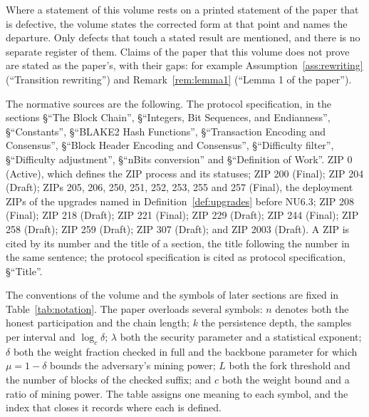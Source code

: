 \documentclass[11pt,a4paper]{article}
\theoremstyle{definition}
\begin{document}
Where a statement of this volume rests on a printed statement of the paper
that is defective, the volume states the corrected form at that point and
names the departure. Only defects that touch a stated result are mentioned,
and there is no separate register of them. Claims of the paper that this
volume does not prove are stated as the paper's, with their gaps: for
example Assumption~\ref{ass:rewriting} (``Transition rewriting'') and
Remark~\ref{rem:lemma1} (``Lemma 1 of the paper'').

The normative sources are the following. The protocol specification, in the
sections \S``The Block Chain'', \S``Integers, Bit Sequences, and
Endianness'', \S``Constants'', \S``BLAKE2 Hash Functions'',
\S``Transaction Encoding and Consensus'', \S``Block Header Encoding and
Consensus'', \S``Difficulty filter'', \S``Difficulty adjustment'',
\S``nBits conversion'' and \S``Definition of Work''. ZIP 0 (Active),
which defines the ZIP process and its statuses; ZIP 200 (Final); ZIP 204
(Draft); ZIPs 205, 206, 250, 251, 252, 253, 255 and 257 (Final), the
deployment ZIPs of the upgrades named in Definition~\ref{def:upgrades}
before NU6.3; ZIP 208 (Final); ZIP 218 (Draft); ZIP 221 (Final); ZIP 229
(Draft); ZIP 244 (Final); ZIP 258 (Draft); ZIP 259 (Draft); ZIP 307 (Draft);
and ZIP 2003 (Draft). A ZIP is cited by its number and the title of a section,
the title following the number in the same sentence; the protocol specification
is cited as protocol specification, \S``Title''.

The conventions of the volume and the symbols of later sections are fixed in
Table~\ref{tab:notation}. The paper overloads several symbols: $n$ denotes
both the honest participation and the chain length; $k$ the persistence
depth, the samples per interval and $\log_c \delta$; $\lambda$ both the
security parameter and a statistical exponent; $\delta$ both the weight
fraction checked in full and the backbone parameter for which
$\mu = 1 - \delta$ bounds the adversary's mining power; $L$ both
the fork threshold and the number of blocks of the checked suffix; and $c$
both the weight bound and a ratio of mining power. The table assigns one
meaning to each symbol, and the index that closes it records where each is
defined.
\end{document}
